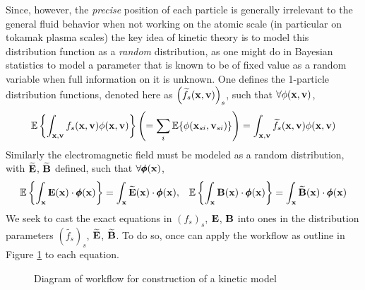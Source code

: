     Since, however, the \emph{precise} position of each particle is generally irrelevant to the general fluid behavior when not working on the atomic scale (in particular on tokamak plasma scales) the key idea of kinetic theory is to model this distribution function as a \emph{random} distribution, as one might do in Bayesian statistics to model a parameter that is known to be of fixed value as a random variable when full information on it is unknown. One defines the 1-particle distribution functions, denoted here as $\left(\widetilde{f_{s}}(\mathbf{x}, \mathbf{v})\right)_{s}$, such that $\forall \phi(\mathbf{x}, \mathbf{v})$,
    \begin{equation}
        \mathbb{E}\left\{\int_{\mathbf{x}, \mathbf{v}}f_{s}(\mathbf{x}, \mathbf{v})\phi(\mathbf{x}, \mathbf{v})\right\}
        \left(=  \sum_{i}\mathbb{E}\{\phi(\mathbf{x}_{si}, \mathbf{v}_{si})\}\right)
        =  \int_{\mathbf{x}, \mathbf{v}}\widetilde{f_{s}}(\mathbf{x}, \mathbf{v})\phi(\mathbf{x}, \mathbf{v})
    \end{equation}
    Similarly the electromagnetic field must be modeled as a random distribution, with $\widetilde{\mathbf{E}}$, $\widetilde{\mathbf{B}}$ defined, such that $\forall \pmb{\mathsf{\phi}}(\mathbf{x})$,
    \begin{align}
        \mathbb{E}\left\{\int_{\mathbf{x}}\mathbf{E}(\mathbf{x})\cdot\pmb{\mathsf{\phi}}(\mathbf{x})\right\}  =  \int_{\mathbf{x}}\widetilde{\mathbf{E}}(\mathbf{x})\cdot\pmb{\mathsf{\phi}}(\mathbf{x}),  && 
        \mathbb{E}\left\{\int_{\mathbf{x}}\mathbf{B}(\mathbf{x})\cdot\pmb{\mathsf{\phi}}(\mathbf{x})\right\}  =  \int_{\mathbf{x}}\widetilde{\mathbf{B}}(\mathbf{x})\cdot\pmb{\mathsf{\phi}}(\mathbf{x})
    \end{align}
    We seek to cast the exact equations in $(f_{s})_{s}$, $\mathbf{E}$, $\mathbf{B}$ into ones in the distribution parameters $\left(\widetilde{f_{s}}\right)_{s}$, $\widetilde{\mathbf{E}}$, $\widetilde{\mathbf{B}}$. To do so, once can apply the workflow as outline in Figure \ref{kinetic model construction workflow} to each equation.
    \begin{figure}[!h]
        \centering
        \caption{Diagram of workflow for construction of a kinetic model}
        \label{kinetic model construction workflow}
    \end{figure}


